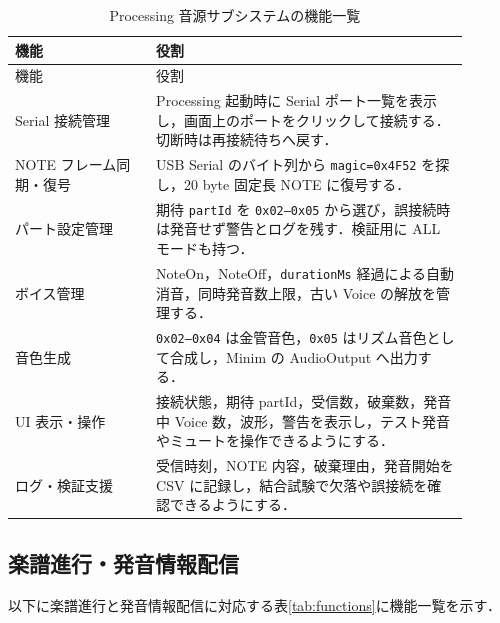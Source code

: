 \documentclass[lualatex,book,paper=a4paper,jafontsize=11.5pt,jafontscale=1.05]{jlreq}
\begin{document}
\begin{longtable}{p{0.28\linewidth}p{0.62\linewidth}}
\caption{Processing 音源サブシステムの機能一覧}\label{tab:fbs}\\
\toprule
機能 & 役割 \\
\midrule
\endfirsthead
\toprule
機能 & 役割 \\
\midrule
\endhead
Serial 接続管理 &
Processing 起動時に Serial ポート一覧を表示し，画面上のポートをクリックして接続する．切断時は再接続待ちへ戻す． \\
NOTE フレーム同期・復号 &
USB Serial のバイト列から \texttt{magic=0x4F52} を探し，20 byte 固定長 NOTE に復号する． \\
パート設定管理 &
期待 \texttt{partId} を \texttt{0x02--0x05} から選び，誤接続時は発音せず警告とログを残す．検証用に ALL モードも持つ． \\
ボイス管理 &
NoteOn，NoteOff，\texttt{durationMs} 経過による自動消音，同時発音数上限，古い Voice の解放を管理する． \\
音色生成 &
\texttt{0x02--0x04} は金管音色，\texttt{0x05} はリズム音色として合成し，Minim の AudioOutput へ出力する． \\
UI 表示・操作 &
接続状態，期待 partId，受信数，破棄数，発音中 Voice 数，波形，警告を表示し，テスト発音やミュートを操作できるようにする． \\
ログ・検証支援 &
受信時刻，NOTE 内容，破棄理由，発音開始を CSV に記録し，結合試験で欠落や誤接続を確認できるようにする． \\
\bottomrule
\end{longtable}

\subsection{楽譜進行・発音情報配信}
以下に楽譜進行と発音情報配信に対応する表\ref{tab:functions}に機能一覧を示す．
\end{document}
